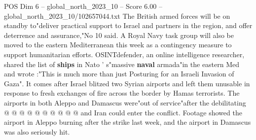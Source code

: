 \begin{textsample}{POS Dim 6 – global\_north\_2023\_10 – Score 6.00 – global\_north\_2023\_10/102657044.txt}
The British armed forces will be on standby to"deliver practical support to Israel and partners in the region, and offer deterrence and assurance,"No 10 said.
A Royal Navy task group will also be moved to the eastern Mediterranean this week as a contingency measure to support humanitarian efforts.
OSINTdefender, an online intelligence researcher, shared the list of \textbf{ships} in Nato ' s"massive \textbf{naval} armada"in the eastern Med and wrote :"This is much more than just Posturing for an Israeli Invasion of Gaza".
It comes after Israel blitzed two Syrian airports and left them unusable in response to fresh exchanges of fire across the border by Hamas terrorists.
The airports in both Aleppo and Damascus were"out of service"after the debilitating @ @ @ @ @ @ @ @ @ @ and Iran could enter the conflict.
Footage showed the airport in Aleppo burning after the strike last week, and the airport in Damascus was also seriously hit.

\end{textsample}
